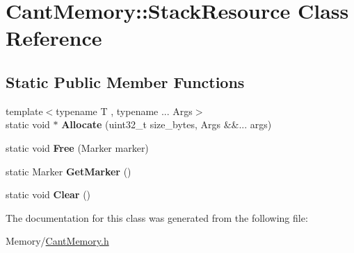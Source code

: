 \hypertarget{classCantMemory_1_1StackResource}{}\section{Cant\+Memory\+:\+:Stack\+Resource Class Reference}
\label{classCantMemory_1_1StackResource}
\subsection*{Static Public Member Functions}
\begin{DoxyCompactItemize}
\item 
\mbox{\label{classCantMemory_1_1StackResource_ae49cf3e963e467779a7c983d8e39dcf6}} 
{\footnotesize template$<$typename T , typename ... Args$>$ }\\static void $\ast$ {\bfseries Allocate} (uint32\+\_\+t size\+\_\+bytes, Args \&\&... args)
\item 
\mbox{\label{classCantMemory_1_1StackResource_abaf58fa8d9d73bd88784baf2832f24b9}} 
static void {\bfseries Free} (Marker marker)
\item 
\mbox{\label{classCantMemory_1_1StackResource_a67638e0e5c3ff15d3b55d6303292d432}} 
static Marker {\bfseries Get\+Marker} ()
\item 
\mbox{\label{classCantMemory_1_1StackResource_a0b2c764865731081a333c54821cd388f}} 
static void {\bfseries Clear} ()
\end{DoxyCompactItemize}


The documentation for this class was generated from the following file\+:\begin{DoxyCompactItemize}
\item 
Memory/\hyperlink{CantMemory_8h}{Cant\+Memory.\+h}\end{DoxyCompactItemize}
